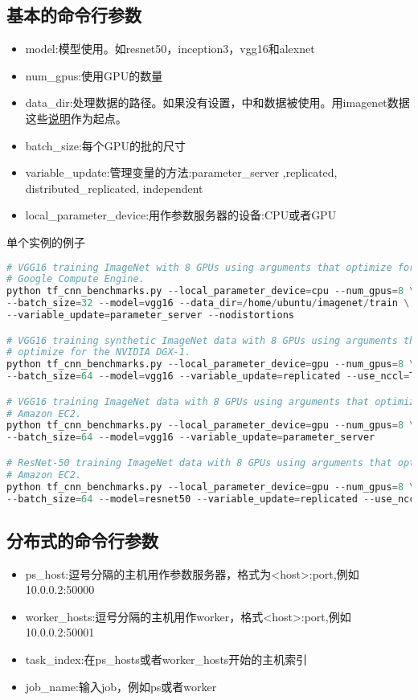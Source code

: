 \subsection{基本的命令行参数}
\begin{itemize}
	\item model:模型使用。如resnet50，inception3，vgg16和alexnet
	\item num\_gpus:使用GPU的数量
	\item data\_dir:处理数据的路径。如果没有设置，中和数据被使用。用imagenet数据这些\href{https://github.com/tensorflow/models/tree/master/inception#getting-started}{说明}作为起点。
	\item batch\_size:每个GPU的批的尺寸
	\item variable\_update:管理变量的方法:parameter\_server ,replicated, distributed\_replicated, independent
	\item local\_parameter\_device:用作参数服务器的设备:CPU或者GPU
\end{itemize}
单个实例的例子
\begin{lstlisting}[language=Python]
# VGG16 training ImageNet with 8 GPUs using arguments that optimize for
# Google Compute Engine.
python tf_cnn_benchmarks.py --local_parameter_device=cpu --num_gpus=8 \
--batch_size=32 --model=vgg16 --data_dir=/home/ubuntu/imagenet/train \
--variable_update=parameter_server --nodistortions

# VGG16 training synthetic ImageNet data with 8 GPUs using arguments that
# optimize for the NVIDIA DGX-1.
python tf_cnn_benchmarks.py --local_parameter_device=gpu --num_gpus=8 \
--batch_size=64 --model=vgg16 --variable_update=replicated --use_nccl=True

# VGG16 training ImageNet data with 8 GPUs using arguments that optimize for
# Amazon EC2.
python tf_cnn_benchmarks.py --local_parameter_device=gpu --num_gpus=8 \
--batch_size=64 --model=vgg16 --variable_update=parameter_server

# ResNet-50 training ImageNet data with 8 GPUs using arguments that optimize for
# Amazon EC2.
python tf_cnn_benchmarks.py --local_parameter_device=gpu --num_gpus=8 \
--batch_size=64 --model=resnet50 --variable_update=replicated --use_nccl=False
\end{lstlisting}
\subsection{分布式的命令行参数}
\begin{itemize}
	\item ps\_host:逗号分隔的主机用作参数服务器，格式为<host>:port,例如10.0.0.2:50000
	\item worker\_hosts:逗号分隔的主机用作worker，格式<host>:port,例如10.0.0.2:50001
	\item task\_index:在ps\_hosts或者worker\_hosts开始的主机索引
	\item job\_name:输入job，例如ps或者worker 
\end{itemize}
